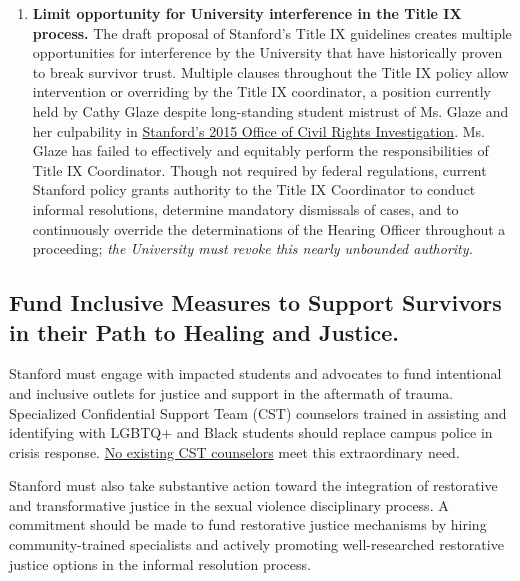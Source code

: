 \documentclass[12pt, titlepage, letterpaper]{article}
\begin{document}
\begin{enumerate}[label=\textbf{\arabic*.}]
    \item \textbf{Limit opportunity for University interference in the Title IX process.} The draft proposal of Stanford’s Title IX guidelines creates multiple opportunities for interference by the University that have historically proven to break survivor trust. Multiple clauses throughout the Title IX policy allow intervention or overriding by the Title IX coordinator, a position currently held by Cathy Glaze despite long-standing student mistrust of Ms. Glaze and her culpability in \href{https://provost.stanford.edu/wp-content/uploads/sites/4/2018/04/OCR-Redacted-Stanford-Letter-of-Finding.pdf}{Stanford’s 2015 Office of Civil Rights Investigation}. Ms. Glaze has failed to effectively and equitably perform the responsibilities of Title IX Coordinator. Though not required by federal regulations, current Stanford policy grants authority to the Title IX Coordinator to conduct informal resolutions, determine mandatory dismissals of cases, and to continuously override the determinations of the Hearing Officer throughout a proceeding; \textit{the University must revoke this nearly unbounded authority.}  

\end{enumerate}

\subsection*{Fund Inclusive Measures to Support Survivors in their Path to Healing and Justice.}
%

Stanford must engage with impacted students and advocates to fund intentional and inclusive outlets for justice and support in the aftermath of trauma. Specialized Confidential Support Team (CST) counselors trained in assisting and identifying with LGBTQ+ and Black students should replace campus police in crisis response. \href{https://vaden.stanford.edu/cst/who-we-are}{No existing CST counselors} meet this extraordinary need.

Stanford must also take substantive action toward the integration of restorative and transformative justice in the sexual violence disciplinary process. A commitment should be made to fund restorative justice mechanisms by hiring community-trained specialists and actively promoting well-researched restorative justice options in the informal resolution process. 
\end{document}
